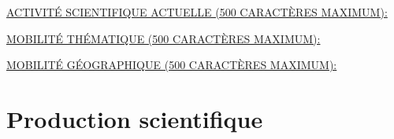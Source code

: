 \documentclass[a4paper,11pt]{article}
\newcommand{\anglaisFrancais}[2]{#2}
\newcommand{\anglaisFrancais}[2]{#1}
\newcommand{\instructionsNotice}[1]{{\color{gray}{#1}}}
\newcommand{\instructionsNotice}[1]{}
\begin{document}
\noindent\underline{\MakeUppercase{\anglaisFrancais{Current scientific activity (maximum 500 characters):}{Activité scientifique actuelle (500 caractères maximum): }}}



\bigskip
\bigskip

\noindent\underline{\MakeUppercase{\anglaisFrancais{Mobility across thematic areas (maximum 500 characters):}{Mobilité thématique (500 caractères maximum): }}}

\bigskip



\bigskip
\bigskip

\noindent\underline{\MakeUppercase{\anglaisFrancais{Geographic mobility (maximum 500 characters):}{Mobilité géographique (500 caractères maximum): }}}

\bigskip




\section{\anglaisFrancais{Publication record}{Production scientifique}}

\instructionsNotice{%
Nombre de publications scientifiques.
\\
Résumé des 5 publications scientifiques les plus significatives mentionnées dans la fiche de synthèse du dossier (4 pages maximum).
}
\end{document}
